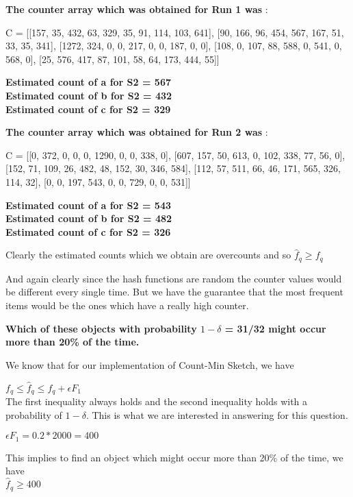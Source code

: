 \documentclass[11pt]{article}
\begin{document}
\begin{itemize}
\textbf{The counter array which was obtained for Run 1 was} :

C = [[157, 35, 432, 63, 329, 35, 91, 114, 103, 641], [90, 166, 96, 454, 567, 167, 51, 33, 35, 341], [1272, 324, 0, 0, 217, 0, 0, 187, 0, 0], [108, 0, 107, 88, 588, 0, 541, 0, 568, 0], [25, 576, 417, 87, 101, 58, 64, 173, 444, 55]]

\textbf{Estimated count of a for S2 = 567\\
	Estimated count of b for S2 = 432\\
	Estimated count of c for S2 = 329\\}

\textbf{The counter array which was obtained for Run 2 was} :

C = [[0, 372, 0, 0, 0, 1290, 0, 0, 338, 0], [607, 157, 50, 613, 0, 102, 338, 77, 56, 0], [152, 71, 109, 26, 482, 48, 152, 30, 346, 584], [112, 57, 511, 66, 46, 171, 565, 326, 114, 32], [0, 0, 197, 543, 0, 0, 729, 0, 0, 531]]

\textbf{Estimated count of a for S2 = 543\\
	Estimated count of b for S2 = 482\\
	Estimated count of c for S2 = 326\\}

	

Clearly the estimated counts which we obtain are overcounts and so $\hat f_q \geq f_q$

And again clearly since the hash functions are random the counter values would be different every single time. But we have the guarantee that the most frequent items would be the ones which have a really high counter. 

\pagebreak

\textbf{Which of these objects with probability $ 1- \delta$ = 31/32 might occur more than 20\% of the time.}
	
	
We know that for our implementation of Count-Min Sketch, we have 

$ f_q \leq 	\hat f_q \leq f_q + \epsilon F_1 $ \\

The first inequality always holds and the second inequality holds with a probability of $1 - \delta $. This is what we are interested in answering for this question. 

$\epsilon F_1 =0.2 *2000 = 400 $

This implies to find an object which might occur more than 20\% of the time, we have \\
$\hat f_q \geq 400 $\\


\end{itemize}
\end{document}
